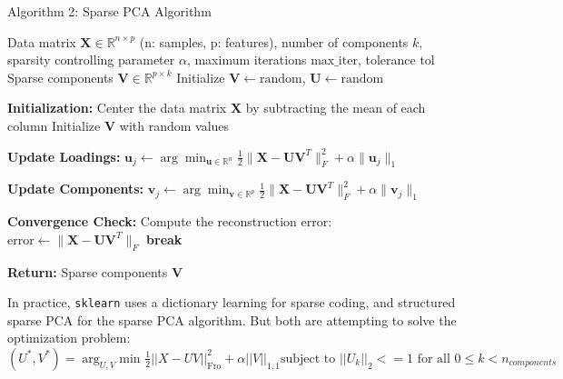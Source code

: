 \documentclass[12pt]{report} %
\begin{document}
\newpage

\begin{definitionbox}{Algorithm 2: Sparse PCA Algorithm}
  \begin{algorithmic}[1]
    \State Data matrix $\mathbf{X} \in \mathbb{R}^{n \times p}$ (n: samples, p: features), number of components $k$, sparsity controlling parameter $\alpha$, maximum iterations $\text{max\_iter}$, tolerance $\text{tol}$ 
    \State Sparse components $\mathbf{V} \in \mathbb{R}^{p \times k}$ 
    \State Initialize $\mathbf{V} \gets \text{random}$, $\mathbf{U} \gets \text{random}$ 

    \State \textbf{Initialization:}
    \State Center the data matrix $\mathbf{X}$ by subtracting the mean of each column
    \State Initialize $\mathbf{V}$ with random values

     
      \State \textbf{Update Loadings:}
       
        \State $\mathbf{u}_j \gets \arg \min_{\mathbf{u} \in \mathbb{R}^n} \frac{1}{2} \|\mathbf{X} - \mathbf{U} \mathbf{V}^T\|_F^2 + \alpha \|\mathbf{u}_j\|_1$
      \EndFor

      \State \textbf{Update Components:}
       
        \State $\mathbf{v}_j \gets \arg \min_{\mathbf{v} \in \mathbb{R}^p} \frac{1}{2} \|\mathbf{X} - \mathbf{U} \mathbf{V}^T\|_F^2 + \alpha \|\mathbf{v}_j\|_1$
      \EndFor

      \State \textbf{Convergence Check:}
      \State Compute the reconstruction error: $\text{error} \gets \|\mathbf{X} - \mathbf{U} \mathbf{V}^T\|_F$
        \State \textbf{break}
      \EndIf
    \EndFor

    \State \textbf{Return:} Sparse components $\mathbf{V}$

  \end{algorithmic}
  In practice, \texttt{sklearn} uses a dictionary learning for sparse coding\cite{mairal2010online}, and structured sparse PCA\cite{jenatton2010structured} for the sparse PCA algorithm. But both are attempting to solve the optimization problem: $(U^*, V^*) = \arg_{U, V} \text{min } \frac{1}{2} ||X-UV||_{\text{Fro}}^2+\alpha||V||_{1,1} \text{subject to } ||U_k||_2 <= 1 \text{ for all } 0 \leq k < n_{components}$
  \label{alg:SPCA}
\end{definitionbox}




\end{document}
